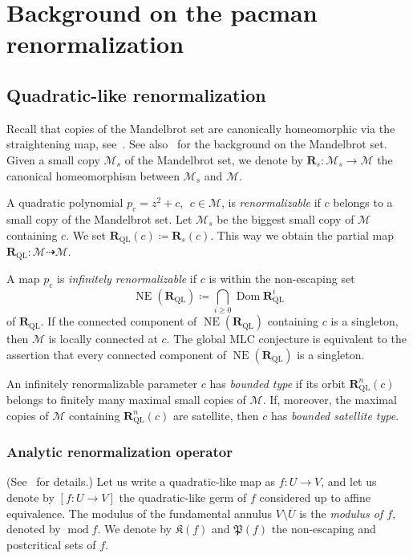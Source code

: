\documentclass{amsart}
\newcommand{\Dom}{\operatorname {Dom}}
\newcommand{\NE}{\operatorname {NE}}
\renewcommand{\sp}{{\ \ }}
\newcommand{\1}{{\mathbb 1 }}
\newcommand{\Mandel}{{\mathcal{M}}}
\newcommand\mRR{\boldsymbol R}%
\newcommand\Kfilled{{\mathfrak K}}
\newcommand\Post{{\mathfrak P}}
\theoremstyle{remark}
\numberwithin{equation}{section}
\theoremstyle{definition}
\def\QL{{\text{QL}}}
\renewcommand{\mod}{\operatorname{mod}}
\theoremstyle{nonumberbreak}
\begin{document}
 
 
  


\section{Background on the pacman renormalization}
\label{s:PacmanRenorm}

\subsection{Quadratic-like renormalization}
\label{ss:QL renorm}
Recall that copies of the Mandelbrot set are canonically homeomorphic via the straightening map, see~\cite{DH}. See also~\cites{DH:Orsay,L-book} for the background on the Mandelbrot set. Given a small copy $\Mandel_s$ of the Mandelbrot set, we denote by $\mRR_s\colon  \Mandel_s \to \Mandel$ the canonical homeomorphism between $\Mandel_s$ and $\Mandel$.

A quadratic polynomial $p_c=z^2+c, \sp c\in \Mandel$, is \emph{renormalizable} if $c$ belongs to a small copy of the Mandelbrot set. Let $\Mandel_s$ be the biggest small copy of $\Mandel$ containing $c$. We set $\mRR_\QL(c)\coloneqq \mRR_s(c)$. This way we obtain the partial map $\mRR_\QL\colon \Mandel\dashrightarrow \Mandel$. 

A map $p_c$ is \emph{infinitely renormalizable} if $c$ is within the non-escaping set \[ \NE(\mRR_\QL) \coloneqq \bigcap_{i\ge0} \Dom \mRR^i_\QL\]
of $\mRR_\QL$. If the connected component of $\NE(\mRR_\QL)$ containing $c$ is a singleton, then $\Mandel$ is locally connected at $c$. The global MLC conjecture is equivalent to the assertion that every connected component of $\NE(\mRR_\QL)$ is a singleton. 

An infinitely renormalizable parameter $c$ has \emph{bounded type} if its orbit $\mRR_\QL^n(c)$ belongs to finitely many maximal small copies of $\Mandel$. If, moreover, the maximal copies of $\Mandel$ containing $\mRR_\QL^n(c)$ are satellite, then $c$ has  \emph{bounded satellite type}. 


\subsubsection{Analytic renormalization operator}\label{ssss:QL anal ren} (See~\cite{L:FCT} for details.) Let us write a quadratic-like map as $f\colon U\to V$, and let us denote by $[f\colon U\to V]$ the quadratic-like germ of $f$ considered up to affine equivalence. The modulus of the fundamental annulus $V\setminus\overline U$ is the \emph{modulus of $f$}, denoted by $\mod f$. We denote by $\Kfilled(f)$ and $\Post(f)$ the non-escaping and postcritical sets of $f$.
 
\end{document}
